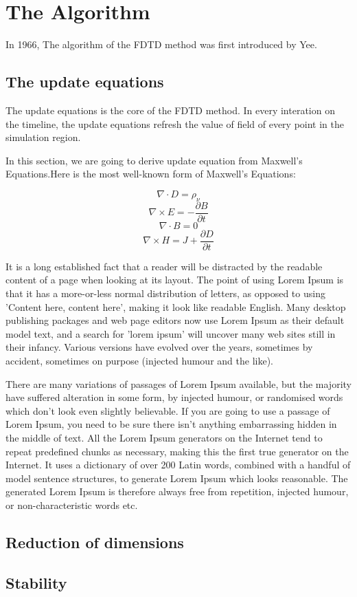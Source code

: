 \section{The Algorithm}

In 1966, The algorithm of the FDTD method was first introduced by Yee.

\subsection{The update equations}

The update equations is the core of the FDTD method. In every interation on the timeline, the update equations refresh
the value of field of every point in the simulation region.

In this section, we are going to derive update equation from Maxwell's Equations.Here is the most well-known form of
Maxwell's Equations:

\begin{displaymath}
  \nabla \cdot D = \rho_{\nu}
\end{displaymath}
\begin{displaymath}
    \nabla \times E = -\frac{\partial B}{\partial t}
\end{displaymath}
\begin{displaymath}
  \nabla \cdot B = 0
\end{displaymath}
\begin{displaymath}
  \nabla \times H = J + \frac{\partial D}{\partial t}
\end{displaymath}

It is a long established fact that a reader will be distracted by the readable content of a page when looking at its
layout. The point of using Lorem Ipsum is that it has a more-or-less normal distribution of letters, as opposed to using
'Content here, content here', making it look like readable English. Many desktop publishing packages and web page
editors now use Lorem Ipsum as their default model text, and a search for 'lorem ipsum' will uncover many web sites
still in their infancy. Various versions have evolved over the years, sometimes by accident, sometimes on purpose
(injected humour and the like).

There are many variations of passages of Lorem Ipsum available, but the majority have suffered alteration in some form,
by injected humour, or randomised words which don't look even slightly believable. If you are going to use a passage of
Lorem Ipsum, you need to be sure there isn't anything embarrassing hidden in the middle of text. All the Lorem Ipsum
generators on the Internet tend to repeat predefined chunks as necessary, making this the first true generator on the
Internet. It uses a dictionary of over 200 Latin words, combined with a handful of model sentence structures, to
generate Lorem Ipsum which looks reasonable. The generated Lorem Ipsum is therefore always free from repetition,
injected humour, or non-characteristic words etc.



\subsection{Reduction of dimensions}
\subsection{Stability}
